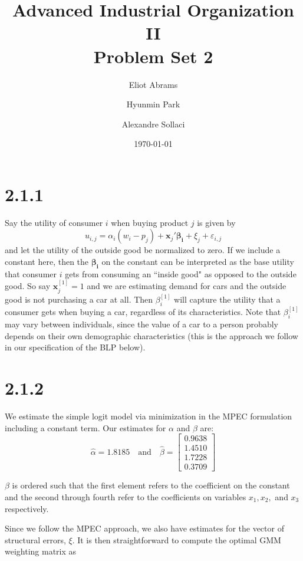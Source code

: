\documentclass[a4paper,11pt]{article}
\begin{document}
\title{Advanced Industrial Organization II \\ Problem Set 2}
\author{Eliot Abrams \and Hyunmin Park \and Alexandre Sollaci}
\date{\today}
\maketitle

\section*{2.1.1}
Say the utility of consumer $i$ when buying product $j$ is given by
\[ u_{i,j} = \alpha_i(w_i - p_j) + \mathbf{x}_j'\mathbf{\beta_i} + \xi_j + \varepsilon_{i,j} \]
and let the utility of the outside good be normalized to zero. If we include a constant here, then the $\mathbf{\beta_i}$ on the constant can be interpreted as the base utility that consumer $i$ gets from consuming an ``inside good" as opposed to the outside good. So say $\mathbf{x}_j^{[1]} = 1$ and we are estimating demand for cars and the outside good is not purchasing a car at all. Then $\beta_i^{[1]}$ will capture the utility that a consumer gets when buying a car, regardless of its characteristics. Note that $\beta_i^{[1]}$ may vary between individuals, since the value of a car to a person probably depends on their own demographic characteristics (this is the approach we follow in our specification of the BLP below). 

\section*{2.1.2}
We estimate the simple logit model via minimization in the MPEC formulation including a constant term. Our estimates for $\alpha$ and $\beta$ are:
\[
\hat\alpha = 1.8185 \quad \mbox{and}  \quad
\hat\beta = \left[\begin{array}{l} 0.9638 \\ 1.4510 \\ 1.7228 \\ 0.3709 \end{array}\right] \]

$\beta$ is ordered such that the first element refers to the coefficient on the constant and the second through fourth refer to the coefficients on variables $x_1, x_2,$ and $x_3$ respectively.

Since we follow the MPEC approach, we also have estimates for the vector of structural errors, $\xi$. It is then straightforward to compute the optimal GMM weighting matrix as
\end{document}
